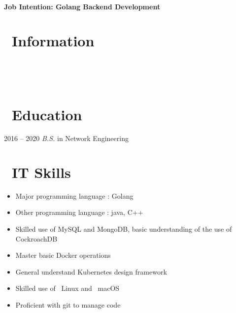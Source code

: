 \documentclass{resume}
\begin{document}

  \hfill \vspace{2mm} \par
\textbf{Job Intention: Golang Backend Development}

\section{\faUserSecret\ Information} \vspace{1mm}

{\phone\  \qquad\qquad\quad
	\email\ 
	\vspace{2mm} \par
	\github\  \qquad
	\faLink\ }

\section{\faGraduationCap\ Education} \vspace{1mm}

{2016 -- 2020}
\vspace{1mm}
\textit{B.S.} in Network Engineering

\section{\faCogs\ IT Skills} \vspace{1mm}

\begin{itemize}[parsep=1ex]
	\item Major programming language : Golang
	\item Other programming language : java, C++
	\item Skilled use of MySQL and MongoDB, basic understanding of the use of CockroachDB
	\item Master basic Docker operations
	\item General understand Kubernetes design framework
	\item Skilled use of \faLinux\ {Linux} and \faApple\ {macOS}
	\item Proficient with git to manage code
\end{itemize}
\end{document}
